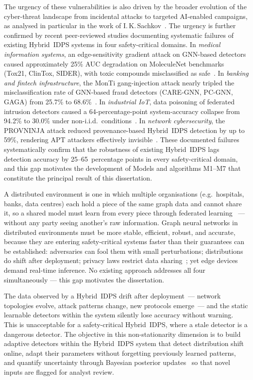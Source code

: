 The urgency of these vulnerabilities is also driven by the broader
evolution of the cyber-threat landscape from incidental attacks to
targeted AI-enabled campaigns, as analysed in particular in the
work of I.\,K.\,Sachkov~\cite{Sachkov2022threat}. The urgency is
further confirmed by recent peer-reviewed studies documenting
systematic failures of existing Hybrid~IDPS systems in four
safety-critical domains. In \emph{medical information systems}, an
edge-sensitivity gradient attack on GNN-based detectors caused
approximately 25\% AUC degradation on MoleculeNet benchmarks
(Tox21, ClinTox, SIDER), with toxic compounds misclassified as
safe~\cite{EdgeSensitivity2025}. In \emph{banking and fintech
infrastructure}, the MonTi gang-injection attack nearly tripled
the misclassification rate of GNN-based fraud detectors (CARE-GNN,
PC-GNN, GAGA) from 25.7\% to 68.6\%~\cite{MonTi2025}. In
\emph{industrial IoT}, data poisoning of federated intrusion
detectors caused a 64-percentage-point system-accuracy collapse
from 94.2\% to 30.0\% under non-i.i.d.\
conditions~\cite{FerragPoisoning2023}. In \emph{network
cybersecurity}, the PROVNINJA attack reduced provenance-based
Hybrid~IDPS detection by up to 59\%, rendering APT attackers
effectively invisible~\cite{PROVNINJA2023}. These documented
failures systematically confirm that the robustness of existing
Hybrid~IDPS lags detection accuracy by 25--65~percentage points in
every safety-critical domain, and this gap motivates the
development of Models and algorithms M1--M7 that constitute the
principal result of this dissertation.

A distributed environment is one in which multiple organisations (e.g.\ hospitals, banks, data centres) each hold a piece of the same graph data and cannot share it, so a shared model must learn from every piece through federated learning~\cite{Blanchard2017} --- without any party seeing another's raw information. Graph neural networks in distributed environments must be more stable, efficient, robust, and accurate, because they are entering safety-critical systems faster than their guarantees can be established: adversaries can fool them with small perturbations; distributions do shift after deployment; privacy laws restrict data sharing~\cite{Dwork2006,Abadi2016}; yet edge devices demand real-time inference. No existing approach addresses all four simultaneously --- this gap motivates the dissertation.

The data observed by a Hybrid~IDPS drift after
deployment~--- network topologies evolve, attack patterns change,
new protocols emerge~--- and the static learnable detectors within
the system silently lose accuracy without warning. This is
unacceptable for a safety-critical Hybrid~IDPS, where a stale
detector is a dangerous detector. The objective in this
non-stationarity dimension is to build adaptive detectors within
the Hybrid~IDPS system that detect distribution shift online,
adapt their parameters without forgetting previously learned
patterns, and quantify uncertainty through Bayesian posterior
updates~\cite{Gal2016,Kendall2017} so that novel inputs are
flagged for analyst review.

